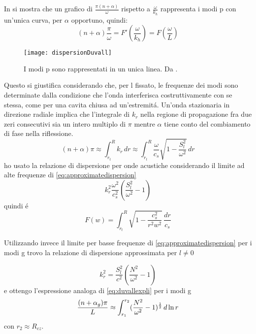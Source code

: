 \documentclass[../main.tex]{subfiles}
\begin{document}
In \citet{duv82dispersion} si mostra che un grafico di $\frac{\pi(n+\alpha)}{\omega}$ rispetto a $\frac{\omega}{k_h}$ rappresenta i modi p con un'unica curva, per $\alpha$ opportuno, quindi:
\begin{equation}
(n+\alpha)\frac{\pi}{\omega}=F'(\frac{\omega}{k_h})=F(\frac{\omega}{L})\label{eq:duvallr}
\end{equation}

\begin{wrapfigure}[15]{r}{0.45\textwidth}
\centering
\texttt{[image: dispersionDuvall]}
\caption{I modi p sono rappresentati in un unica linea. Da \cite{duv82dispersion}.}
\end{wrapfigure}

Questo si giustifica considerando che, per l fissato, le frequenze dei modi sono determinate dalla condizione che l'onda interferisca costruttivamente con se stessa, come per una cavita chiusa ad un'estremit\'a. Un'onda stazionaria in direzione radiale implica che l'integrale di $k_r$ nella regione di propagazione fra due zeri consecutivi sia un intero multiplo di $\pi$ mentre $\alpha$ tiene conto del combiamento di fase nella riflessione.
\begin{equation}
(n+\alpha)\pi\approx\int_{r_t}^Rk_r\,dr\approx\int_{r_t}^R\frac{\omega}{c_s}\sqrt{1-\frac{S_l^2}{\omega^2}}\,dr\label{eq:duvallexpli}
\end{equation}
ho usato la relazione di dispersione per onde acustiche considerando il limite ad alte frequenze di \eqref{eq:approximatedispersion}
\begin{equation}
k_r^2\frac{\omega^2}{c_s^2}(\frac{S_l^2}{\omega^2}-1)
\end{equation}
quindi \'e
\begin{equation}
F(w)=\int_{r_t}^R\sqrt{1-\frac{c_s^2}{r^2w^2}}\,\frac{dr}{c_s}\label{eq:duvallf}
\end{equation}

Utilizzando invece il limite per basse frequenze di \eqref{eq:approximatedispersion} per i modi g trovo la relazione di dispersione approssimata per $l\neq0$

\begin{equation}
k_r^2=\frac{S_l^2}{c^2}(\frac{N^2}{\omega^2}-1)\label{eq:dispersionag}
\end{equation}
e ottengo l'espressione analoga di \eqref{eq:duvallexpli} per i modi g
\begin{equation}
\frac{(n+\alpha_g)\pi}{L}\approx\int_{r_1}^{r_2}(\frac{N^2}{\omega^2}-1)^{\frac{1}{2}}\,d\ln{r}\label{eq:duvallg}
\end{equation}
con $r_2\approx R_{cz}$.
\end{document}
